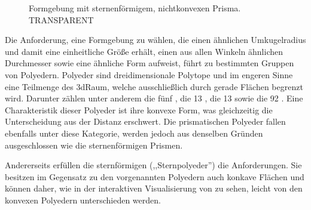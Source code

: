 \begin{figure}
	{\caption{Formgebung mit sternenförmigem, nichtkonvexen Prisma. TRANSPARENT}\label{fig:formen:sterne3d-trans}}
\end{figure}

Die Anforderung, eine Formgebung zu wählen, die einen ähnlichen Umkugelradius und damit eine einheitliche Größe erhält, einen aus allen Winkeln ähnlichen Durchmesser sowie eine ähnliche Form aufweist, führt zu bestimmten Gruppen von Polyedern. Polyeder sind dreidimensionale Polytope und im engeren Sinne eine Teilmenge des \gls{3dRaum}, welche ausschließlich durch gerade Flächen begrenzt wird. Darunter zählen unter anderem die fünf  \cite{RegularPolyhedra}, die 13 , die 13  sowie die 92  \cite{JohnsonPolyeder}. Eine Charakteristik dieser Polyeder ist ihre konvexe Form, was gleichzeitig die Unterscheidung aus der Distanz erschwert. Die prismatischen Polyeder fallen ebenfalls unter diese Kategorie, werden jedoch aus denselben Gründen ausgeschlossen wie die sternenförmigen Prismen.

Andererseits erfüllen die sternförmigen  (,,Sternpolyeder'') die Anforderungen. Sie besitzen im Gegensatz zu den vorgenannten Polyedern auch konkave Flächen \cite{KeplerPoinsotSolid} und können daher, wie in der interaktiven Visualisierung von \cite{WebGLUniformPolyhedra} zu sehen, leicht von den konvexen Polyedern unterschieden werden.

